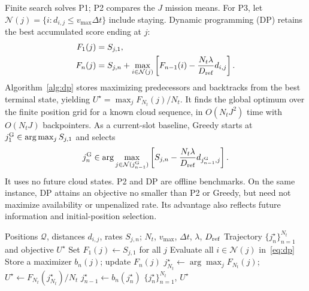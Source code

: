 Finite search solves P1; P2 compares the $J$ mission means. For P3, let
$\mathcal N(j)=\{i:d_{i,j}\le v_{\max}\Delta t\}$ include staying.
Dynamic programming (DP) retains the best accumulated score ending at $j$:
\begin{align}
 F_1(j)&=S_{j,1},\label{eq:dp_init}\\
 F_n(j)&=S_{j,n}+\max_{i\in\mathcal N(j)}
 \left[F_{n-1}(i)-\frac{N_t\lambda}{D_{\rm ref}}d_{i,j}\right].
 \label{eq:dp}
\end{align}
Algorithm~\ref{alg:dp} stores maximizing predecessors and backtracks from
the best terminal state, yielding $U^\star=\max_jF_{N_t}(j)/N_t$.
It finds the global optimum over the finite position grid for a known
cloud sequence, in $O(N_tJ^2)$ time with $O(N_tJ)$ backpointers.
As a current-slot baseline, Greedy starts at
$j_1^{\rm G}\in\arg\max_jS_{j,1}$ and selects
\begin{equation}
 j_n^{\rm G}\in\arg\max_{j\in\mathcal N(j_{n-1}^{\rm G})}
 \left[S_{j,n}-\frac{N_t\lambda}{D_{\rm ref}}d_{j_{n-1}^{\rm G},j}\right].
 \label{eq:greedy}
\end{equation}
It uses no future cloud states. P2 and DP are offline benchmarks.
On the same instance, DP attains an objective no smaller than P2 or Greedy,
but need not maximize availability or unpenalized rate. Its advantage also
reflects future information and initial-position selection.

\begin{algorithm}[t]
\caption{Dynamic Programming for Mobility-Aware UAV Positioning}
\label{alg:dp}
\begin{algorithmic}[1]
\Require Positions $\mathcal Q$, distances $d_{i,j}$, rates $S_{j,n}$;
\Statex \hspace{\algorithmicindent} $N_t$, $v_{\max}$, $\Delta t$, $\lambda$, $D_{\rm ref}$
\Ensure Trajectory $\{j_n^\star\}_{n=1}^{N_t}$ and objective $U^\star$
\State Set $F_1(j)\gets S_{j,1}$ for all $j$
    \State Evaluate all $i\in\mathcal N(j)$ in~\eqref{eq:dp}
    \State Store a maximizer $b_n(j)$; update $F_n(j)$
  \EndFor
\EndFor
\State $j_{N_t}^\star\gets\arg\max_jF_{N_t}(j)$;
\Statex \hspace{\algorithmicindent} $U^\star\gets F_{N_t}(j_{N_t}^\star)/N_t$
  \State $j_{n-1}^\star\gets b_n(j_n^\star)$
\EndFor
\State \Return $\{j_n^\star\}_{n=1}^{N_t}$, $U^\star$
\end{algorithmic}
\end{algorithm}


